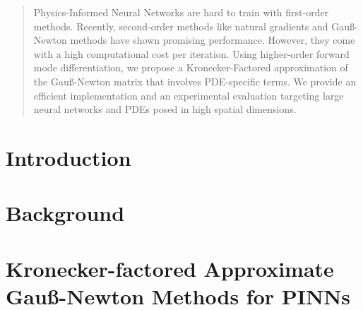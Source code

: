 \documentclass{article}
\begin{document}
\maketitle

\begin{abstract}
  Physics-Informed Neural Networks are hard to train with first-order methods. 
  Recently, second-order methods like natural gradients and Gauß-Newton methods %
  have shown promising performance. 
  However, they come with a high computational cost per iteration. 
  Using higher-order forward mode differentiation, we propose a Kronecker-Factored approximation of the Gauß-Newton matrix that involves PDE-specific terms. 
  We provide an efficient implementation and an experimental evaluation targeting large neural networks and PDEs posed in high spatial dimensions. 
\end{abstract}

\section{Introduction}


\section{Background}




\section{Kronecker-factored Approximate Gauß-Newton Methods for PINNs}\label{sec:kfac_pinns}
\end{document}

